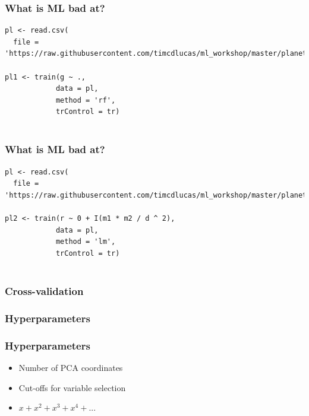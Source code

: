 \documentclass[handout, aspectratio = 169]{beamer}
\begin{document}
\begin{frame}[fragile]
\frametitle{What is ML bad at?}
\renewcommand{\FancyVerbFormatLine}[1]{%
   \ifnum\value{FancyVerbLine}=1\color{cyan}#1%
   \else #1\fi}
\begin{Verbatim}
pl <- read.csv(
  file = 'https://raw.githubusercontent.com/timcdlucas/ml_workshop/master/planets.csv')

pl1 <- train(g ~ ., 
            data = pl,
            method = 'rf',
            trControl = tr)


\end{Verbatim}

\end{frame} 


\begin{frame}[fragile]
\frametitle{What is ML bad at?}
\renewcommand{\FancyVerbFormatLine}[1]{%
   \ifnum\value{FancyVerbLine}=1\color{cyan}#1%
   \else #1\fi}
\begin{Verbatim}
pl <- read.csv(
  file = 'https://raw.githubusercontent.com/timcdlucas/ml_workshop/master/planets.csv')

pl2 <- train(r ~ 0 + I(m1 * m2 / d ^ 2), 
            data = pl,
            method = 'lm',
            trControl = tr)


\end{Verbatim}

\end{frame} 




\begin{frame}
\frametitle{Cross-validation}
\begin{figure}
\end{figure} 
\end{frame} 


\begin{frame}
\frametitle{Hyperparameters}
\begin{figure}
\end{figure} 
\end{frame} 


\begin{frame}
\frametitle{Hyperparameters}
\begin{itemize}
\item Number of PCA coordinates
\item Cut-offs for variable selection
\item $x + x^2 + x^3 + x^4 + ...$
\end{itemize}
\end{frame} 
\end{document}
